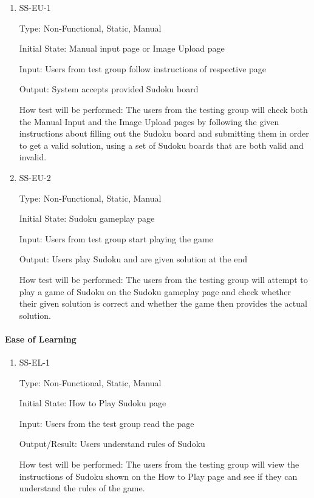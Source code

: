\documentclass[11pt]{article}
\begin{document}
\begin{enumerate}

\item{SS-EU-1\\}

Type: Non-Functional, Static, Manual
					
Initial State: Manual input page or Image Upload page
					
Input: Users from test group follow instructions of respective page
					
Output: System accepts provided Sudoku board
					
How test will be performed: The users from the testing group will check both the Manual Input and the Image Upload pages by following the given instructions about filling out the Sudoku board and submitting them in order to get a valid solution, using a set of Sudoku boards that are both valid and invalid.
					
\item{SS-EU-2\\}

Type: Non-Functional, Static, Manual
					
Initial State: Sudoku gameplay page
					
Input: Users from test group start playing the game
					
Output: Users play Sudoku and are given solution at the end
					
How test will be performed: The users from the testing group will attempt to play a game of Sudoku on the Sudoku gameplay page and check whether their given solution is correct and whether the game then provides the actual solution.

\end{enumerate}

\paragraph{Ease of Learning}

\begin{enumerate}

\item{SS-EL-1\\}

Type: Non-Functional, Static, Manual
					
Initial State: How to Play Sudoku page
					
Input: Users from the test group read the page 
					
Output/Result: Users understand rules of Sudoku
					
How test will be performed: The users from the testing group will view the instructions of Sudoku shown on the How to Play page and see if they can understand the rules of the game.

\end{enumerate}
\end{document}
